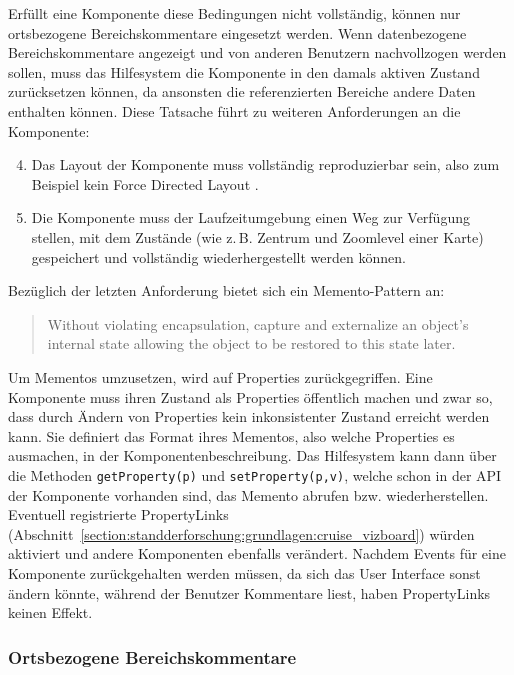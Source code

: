 \documentclass[
	headsepline,
	footsepline,
	fontsize=12pt,
	bibliography=totoc
]{scrbook}
\begin{document}
Erfüllt eine Komponente diese Bedingungen nicht vollständig, können nur ortsbezogene Bereichskommentare eingesetzt werden. Wenn datenbezogene Bereichskommentare angezeigt und von anderen Benutzern nachvollzogen werden sollen, muss das Hilfesystem die Komponente in den damals aktiven Zustand zurücksetzen können, da ansonsten die referenzierten Bereiche andere Daten enthalten können. Diese Tatsache führt zu weiteren Anforderungen an die Komponente:

\begin{enumerate}
	\setcounter{enumi}{3}
	\item Das Layout der Komponente muss vollständig reproduzierbar sein, also zum Beispiel kein Force Directed Layout \cite{Fruchterman1991}.
	\item Die Komponente muss der Laufzeitumgebung einen Weg zur Verfügung stellen, mit dem Zustände (wie z.\,B. Zentrum und Zoomlevel einer Karte) gespeichert und vollständig wiederhergestellt werden können.
\end{enumerate}

Bezüglich der letzten Anforderung bietet sich ein Memento-Pattern \cite{Gamma1994} an:

\begin{quote}
Without violating encapsulation, capture and externalize an object's internal state allowing the object to be restored to this state later.
\end{quote} 

Um Mementos umzusetzen, wird auf Properties zurückgegriffen. Eine Komponente muss ihren Zustand als Properties öffentlich machen und zwar so, dass durch Ändern von Properties kein inkonsistenter Zustand erreicht werden kann. Sie definiert das Format ihres Mementos, also welche Properties es ausmachen, in der Komponentenbeschreibung. Das Hilfesystem kann dann über die Methoden \texttt{getProperty(p)} und \texttt{setProperty(p,v)}, welche schon in der API der Komponente vorhanden sind, das Memento abrufen bzw. wiederherstellen. Eventuell registrierte PropertyLinks (Abschnitt~\ref{section:standderforschung:grundlagen:cruise_vizboard}) würden aktiviert und andere Komponenten ebenfalls verändert. Nachdem Events für eine Komponente zurückgehalten werden müssen, da sich das User Interface sonst ändern könnte, während der Benutzer Kommentare liest, haben PropertyLinks keinen Effekt.

\subsubsection{Ortsbezogene Bereichskommentare}
\end{document}
